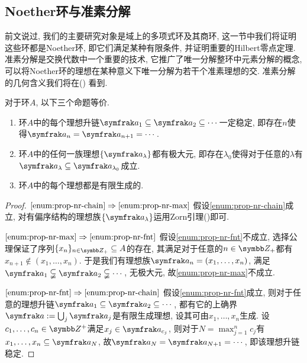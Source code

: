 \subsection{Noether环与准素分解}\label{subsec:primdecom}

前文说过, 我们的主要研究对象是域上的多项式环及其商环, 这一节中我们将证明这些环都是Noether环, 即它们满足某种有限条件, 并证明重要的Hilbert零点定理. 准素分解是交换代数中一个重要的技术, 它推广了唯一分解整环中元素分解的概念, 可以将Noether环的理想在某种意义下唯一分解为若干个准素理想的交. 准素分解的几何含义我们将在()%
看到.

\begin{proposition}\label{prop:noetherring}
    对于环$A$, 以下三个命题等价.
    \begin{enumerate}
        \item\label{enum:prop-nr-chain} 环$A$中的每个理想升链$\ideal{a}_1\subseteq\ideal{a}_2\subseteq\dotsb$一定稳定, 即存在$n$使得$\ideal{a}_n=\ideal{a}_{n+1}=\dotsb$.
        \item\label{enum:prop-nr-max} 环$A$中的任何一族理想$\{\ideal{a}_\lambda\}$都有极大元, 即存在$\lambda_0$使得对于任意的$\lambda$有$\ideal{a}_\lambda\subseteq\ideal{a}_{\lambda_0}$成立.
        \item\label{enum:prop-nr-fnt} 环$A$中的每个理想都是有限生成的.
    \end{enumerate}
\end{proposition}

\begin{proof}
    $\ref{enum:prop-nr-chain}\Rightarrow\ref{enum:prop-nr-max}$ 假设\ref{enum:prop-nr-chain}成立, 对有偏序结构的理想族$\{\ideal{a}_\lambda\}$运用Zorn引理()即可.

    $\ref{enum:prop-nr-max}\Rightarrow\ref{enum:prop-nr-fnt}$ 假设\ref{enum:prop-nr-fnt}不成立, 选择公理\footnotemark 保证了序列$\{x_n\}_{n\in\ZZ_+}\subseteq A$的存在, 其满足对于任意的$n\in\ZZ_+$都有$x_{n+1}\notin (x_1, \dotsc, x_n)$. 于是我们有理想族$\ideal{a}_n=(x_1, \dotsc, x_n)$, 满足$\ideal{a}_1\subsetneqq\ideal{a}_2\subsetneqq\dotsb$, 无极大元, 故\ref{enum:prop-nr-max}不成立.

    $\ref{enum:prop-nr-fnt}\Rightarrow\ref{enum:prop-nr-chain}$ 假设\ref{enum:prop-nr-fnt}成立, 则对于任意的理想升链$\ideal{a}_1\subseteq\ideal{a}_2\subseteq\dotsb$, 都有它的上确界$\ideal{a}:=\bigcup_{j}\ideal{a}_{j}$是有限生成理想, 设其可由$x_1, \dotsc, x_n$生成. 设$c_1, \dotsc, c_n\in \ZZ^+$满足$x_j\in\ideal{a}_{c_j}$, 则对于$N=\max_{j=1}^nc_j$有$x_1, \dotsc, x_n\subseteq\ideal{a}_N$, 故$\ideal{a}_N=\ideal{a}_{N+1}=\dotsb$, 即该理想升链稳定.
\end{proof}

